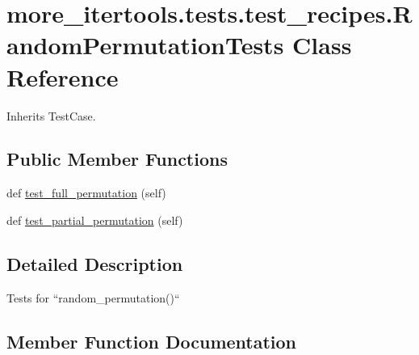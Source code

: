\hypertarget{classmore__itertools_1_1tests_1_1test__recipes_1_1_random_permutation_tests}{}\section{more\+\_\+itertools.\+tests.\+test\+\_\+recipes.\+Random\+Permutation\+Tests Class Reference}
\label{classmore__itertools_1_1tests_1_1test__recipes_1_1_random_permutation_tests}


Inherits Test\+Case.

\subsection*{Public Member Functions}
\begin{DoxyCompactItemize}
\item 
def \hyperlink{classmore__itertools_1_1tests_1_1test__recipes_1_1_random_permutation_tests_a2204797a7f8f81cd8d5bf8fb621e5400}{test\+\_\+full\+\_\+permutation} (self)
\item 
def \hyperlink{classmore__itertools_1_1tests_1_1test__recipes_1_1_random_permutation_tests_a7bde91b775e55e70ccfc03ddf8af9557}{test\+\_\+partial\+\_\+permutation} (self)
\end{DoxyCompactItemize}


\subsection{Detailed Description}
\begin{DoxyVerb}Tests for ``random_permutation()``\end{DoxyVerb}
 

\subsection{Member Function Documentation}
\mbox{\label{classmore__itertools_1_1tests_1_1test__recipes_1_1_random_permutation_tests_a2204797a7f8f81cd8d5bf8fb621e5400}} 
